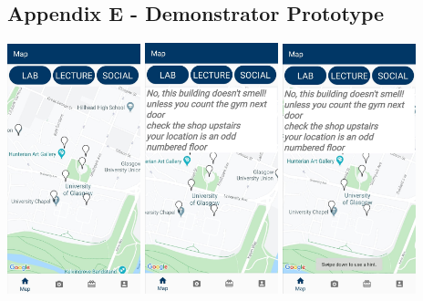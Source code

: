 \documentclass[10pt,twocolumn]{article} %
\begin{document}
\newpage
\subsection*{Appendix E - Demonstrator Prototype}
\vspace*{25px}
\includegraphics[width=0.29\textwidth]{./figures/demonstrator/demo2.jpg}\hfill
\includegraphics[width=0.29\textwidth]{./figures/demonstrator/demo1.jpg}\hfill
\includegraphics[width=0.29\textwidth]{./figures/demonstrator/demo6.jpg}\hfill
\end{document}
